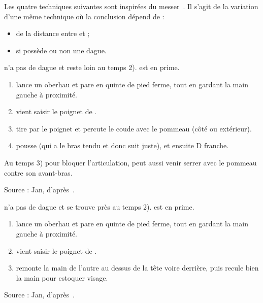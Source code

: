 Les quatre techniques suivantes sont inspirées du messer~\cite{kleinau:dijon:rapier_messer:2015}.
Il s'agit de la variation d'une même technique où la conclusion dépend de :
\begin{itemize}
	\item de la distance entre \A et \D ;
	\item si \A possède ou non une dague.
\end{itemize}



\begin{technique}

\A n'a pas de dague et reste loin au temps 2).
\D est en prime.

\begin{enumerate}
	\item \A lance un oberhau et \D pare en quinte de pied ferme, tout en gardant la main gauche à proximité.
	
	\item \D vient saisir le poignet de \A.
	
	\item \D tire par le poignet et percute le coude avec le pommeau (côté ou extérieur).
	
	\item \D pousse \A (qui a le bras tendu et donc suit juste), et ensuite D franche.
\end{enumerate}

Au temps 3) pour bloquer l'articulation, \D peut aussi venir serrer avec le pommeau contre son avant-bras.

Source : Jan, d'après~\cite{kleinau:dijon:rapier_messer:2015}.

\end{technique}


\begin{technique}

\A n'a pas de dague et se trouve près au temps 2).
\D est en prime.

\begin{enumerate}
	\item \A lance un oberhau et \D pare en quinte de pied ferme, tout en gardant la main gauche à proximité.
	
	\item \D vient saisir le poignet de \A.
	
	\item \D remonte la main de l'autre au dessus de la tête voire derrière, puis recule bien la main pour estoquer visage.
\end{enumerate}

Source : Jan, d'après~\cite{kleinau:dijon:rapier_messer:2015}.

\end{technique}


